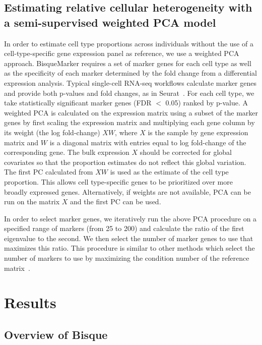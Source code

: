 \subsection{Estimating relative cellular heterogeneity with a semi-supervised weighted PCA model}

In order to estimate cell type proportions across individuals without the use of a cell-type-specific gene expression panel as reference, we use a weighted PCA approach. BisqueMarker requires a set of marker genes for each cell type as well as the specificity of each marker determined by the fold change from a differential expression analysis. Typical single-cell RNA-seq workflows calculate marker genes and provide both p-values and fold changes, as in Seurat~\cite{Butler2018-mj}. For each cell type, we take statistically significant marker genes (FDR $<$ 0.05) ranked by p-value. A weighted PCA is calculated on the expression matrix using a subset of the marker genes by first scaling the expression matrix and multiplying each gene column by its weight (the log fold-change) $XW$, where $X$ is the sample by gene expression matrix and $W$ is a diagonal matrix with entries equal to log fold-change of the corresponding gene. The bulk expression $X$ should be corrected for global covariates so that the proportion estimates do not reflect this global variation. The first PC calculated from $XW$ is used as the estimate of the cell type proportion. This allows cell type-specific genes to be prioritized over more broadly expressed genes. Alternatively, if weights are not available, PCA can be run on the matrix $X$ and the first PC can be used.

In order to select marker genes, we iteratively run the above PCA procedure on a specified range of markers (from 25 to 200) and calculate the ratio of the first eigenvalue to the second. We then select the number of marker genes to use that maximizes this ratio. This procedure is similar to other methods which select the number of markers to use by maximizing the condition number of the reference matrix~\cite{Mohammadi2017-rw}. 

\section{Results}
\subsection{Overview of Bisque}

